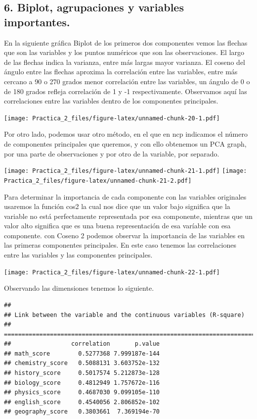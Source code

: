 \documentclass[
]{article}
\begin{document}
\hypertarget{biplot-agrupaciones-y-variables-importantes.}{%
\subsection{6. Biplot, agrupaciones y variables
importantes.}\label{biplot-agrupaciones-y-variables-importantes.}}

En la siguiente gráfica Biplot de los primeros dos componentes vemos las
flechas que son las variables y los puntos numéricos que son las
observaciones. El largo de las flechas indica la varianza, entre más
largas mayor varianza. El coseno del ángulo entre las flechas aproxima
la correlación entre las variables, entre más cercano a 90 o 270 grados
menor correlación entre las variables, un ángulo de 0 o de 180 grados
refleja correlación de 1 y -1 respectivamente. Observamos aquí las
correlaciones entre las variables dentro de los componentes principales.

\texttt{[image: Practica\_2\_files/figure-latex/unnamed-chunk-20-1.pdf]}

Por otro lado, podemos usar otro método, en el que en ncp indicamos el
número de componentes principales que queremos, y con ello obtenemos un
PCA graph, por una parte de observaciones y por otro de la variable, por
separado.

\texttt{[image: Practica\_2\_files/figure-latex/unnamed-chunk-21-1.pdf]}
\texttt{[image: Practica\_2\_files/figure-latex/unnamed-chunk-21-2.pdf]}

Para determinar la importancia de cada componente con las variables
originales usaremos la función cos2 la cual nos dice que un valor bajo
significa que la variable no está perfectamente representada por esa
componente, mientras que un valor alto significa que es una buena
representación de esa varíable con esa componente. con Coseno 2 podemos
observar la importancia de las variables en las primeras componentes
principales. En este caso tenemos las correlaciones entre las variables
y las componentes principales.

\texttt{[image: Practica\_2\_files/figure-latex/unnamed-chunk-22-1.pdf]}

Observando las dimensiones tenemos lo siguiente.

\begin{verbatim}
## 
## Link between the variable and the continuous variables (R-square)
## =================================================================================
##                 correlation       p.value
## math_score        0.5277368 7.999187e-144
## chemistry_score   0.5088131 3.603752e-132
## history_score     0.5017574 5.212873e-128
## biology_score     0.4812949 1.757672e-116
## physics_score     0.4687030 9.099105e-110
## english_score     0.4540056 2.806852e-102
## geography_score   0.3803661  7.369194e-70
\end{verbatim}
\end{document}
